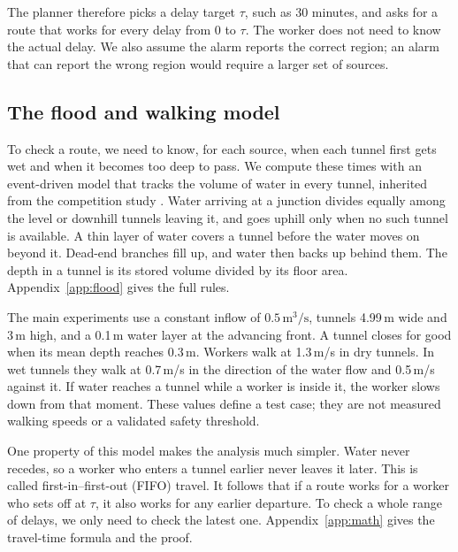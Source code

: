 \documentclass[11pt,a4paper]{article}
\begin{document}
The planner therefore picks a delay target $\tau$, such as 30 minutes, and asks for a route that works for every delay from $0$ to $\tau$. The worker does not need to know the actual delay. We also assume the alarm reports the correct region; an alarm that can report the wrong region would require a larger set of sources.

\subsection{The flood and walking model}\label{sec:hazard}
To check a route, we need to know, for each source, when each tunnel first gets wet and when it becomes too deep to pass. We compute these times with an event-driven model that tracks the volume of water in every tunnel, inherited from the competition study \cite{cumcm}. Water arriving at a junction divides equally among the level or downhill tunnels leaving it, and goes uphill only when no such tunnel is available. A thin layer of water covers a tunnel before the water moves on beyond it. Dead-end branches fill up, and water then backs up behind them. The depth in a tunnel is its stored volume divided by its floor area. Appendix~\ref{app:flood} gives the full rules.

The main experiments use a constant inflow of $0.5\,\mathrm{m^3/s}$, tunnels 4.99\,m wide and 3\,m high, and a 0.1\,m water layer at the advancing front. A tunnel closes for good when its mean depth reaches 0.3\,m. Workers walk at 1.3\,m/s in dry tunnels. In wet tunnels they walk at 0.7\,m/s in the direction of the water flow and 0.5\,m/s against it. If water reaches a tunnel while a worker is inside it, the worker slows down from that moment. These values define a test case; they are not measured walking speeds or a validated safety threshold.

One property of this model makes the analysis much simpler. Water never recedes, so a worker who enters a tunnel earlier never leaves it later. This is called first-in--first-out (FIFO) travel. It follows that if a route works for a worker who sets off at $\tau$, it also works for any earlier departure. To check a whole range of delays, we only need to check the latest one. Appendix~\ref{app:math} gives the travel-time formula and the proof.
\end{document}
